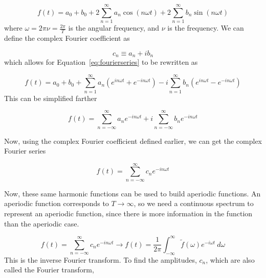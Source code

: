         \begin{equation}
            f(t) = a_0 + b_0 + 2\sum_{n=1}^{\infty} a_n \cos(n\omega
            t)+2\sum_{n=1}^{\infty}b_n\sin(n\omega t)
            \label{eq:fourierseries}
        \end{equation}
        where $\omega=2\pi\nu=\frac{2\pi}{T}$ is the angular frequency, and $\nu$ is the frequency.
        We can define the complex Fourier coefficient as

        \begin{equation}
            c_n \equiv a_n+ib_n
        \end{equation}
        which allows for Equation~\ref{eq:fourierseries} to be rewritten as

        \begin{equation}
            f(t) = a_0 + b_0 +\sum_{n=1}^{\infty} a_n \left( e^{in\omega t} +
            e^{-in\omega t} \right) - i\sum_{n=1}^{\infty} b_n \left( e^{in\omega t} -
            e^{-in\omega t} \right)
        \end{equation}
        This can be simplified farther

        \begin{equation}
            f(t) = \sum_{n=-\infty}^{\infty}a_ne^{-in\omega t} + i\sum_{n=-\infty}^{\infty}b_ne^{-in\omega t}
        \end{equation}

        Now, using the complex Fourier coefficient defined earlier, we can get the
        complex Fourier series

        \begin{equation}
            f(t)=\sum_{n=-\infty}^{\infty}c_ne^{-in\omega t}
        \end{equation}

        Now, these same harmonic functions can be used to build aperiodic functions. An
        aperiodic function corresponds to $T\rightarrow \infty$, so we need a
        continuous spectrum to represent an aperiodic function, since there is more
        information in the function than the aperiodic case.

        \begin{equation}
            f(t)=\sum_{n=-\infty}^{\infty}c_ne^{-in\omega t} \rightarrow
            f(t)=\frac{1}{2\pi}\int_{-\infty}^{\infty} \tilde{f}(\omega) e^{-i\omega t}~d\omega
        \end{equation}
        This is the inverse Fourier transform. To find the amplitudes, $c_n$, which are
        also called the Fourier transform,


